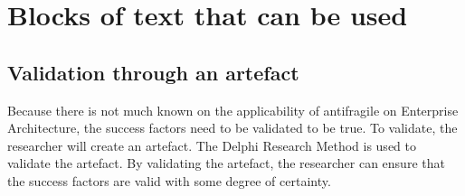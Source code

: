 \chapter{Blocks of text that can be used}

\section{Validation through an artefact}
Because there is not much known on the applicability of antifragile on Enterprise Architecture, the success factors need to be validated to be true. To validate, the researcher will create an artefact. The Delphi Research Method is used to validate the artefact. By validating the artefact, the researcher can ensure that the success factors are valid with some degree of certainty.